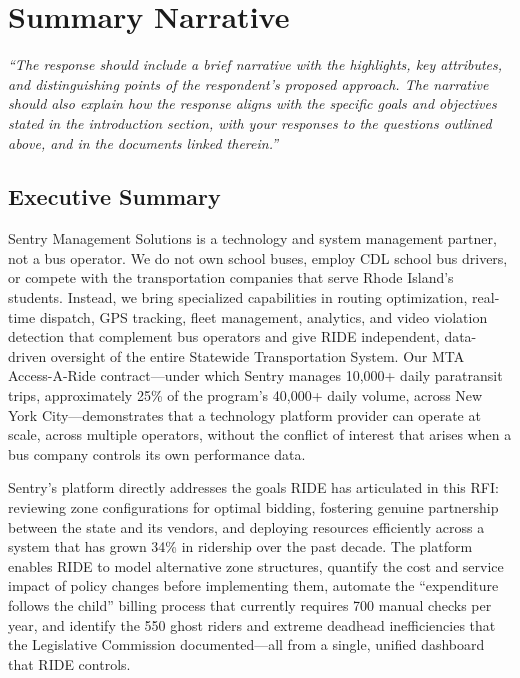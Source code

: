 \section{\texorpdfstring{\color{MidnightBlue}Summary Narrative}{Summary Narrative}}

\textit{``The response should include a brief narrative with the highlights, key attributes, and distinguishing points of the respondent's proposed approach. The narrative should also explain how the response aligns with the specific goals and objectives stated in the introduction section, with your responses to the questions outlined above, and in the documents linked therein.''}

\subsection{Executive Summary}

Sentry Management Solutions is a technology and system management partner, not a bus operator. We do not own school buses, employ CDL school bus drivers, or compete with the transportation companies that serve Rhode Island's students. Instead, we bring specialized capabilities in routing optimization, real-time dispatch, GPS tracking, fleet management, analytics, and video violation detection that complement bus operators and give RIDE independent, data-driven oversight of the entire Statewide Transportation System. Our MTA Access-A-Ride contract---under which Sentry manages 10,000+ daily paratransit trips, approximately 25\% of the program's 40,000+ daily volume, across New York City---demonstrates that a technology platform provider can operate at scale, across multiple operators, without the conflict of interest that arises when a bus company controls its own performance data.

Sentry's platform directly addresses the goals RIDE has articulated in this RFI: reviewing zone configurations for optimal bidding, fostering genuine partnership between the state and its vendors, and deploying resources efficiently across a system that has grown 34\% in ridership over the past decade. The platform enables RIDE to model alternative zone structures, quantify the cost and service impact of policy changes before implementing them, automate the ``expenditure follows the child'' billing process that currently requires 700 manual checks per year, and identify the 550 ghost riders and extreme deadhead inefficiencies that the Legislative Commission documented---all from a single, unified dashboard that RIDE controls.

